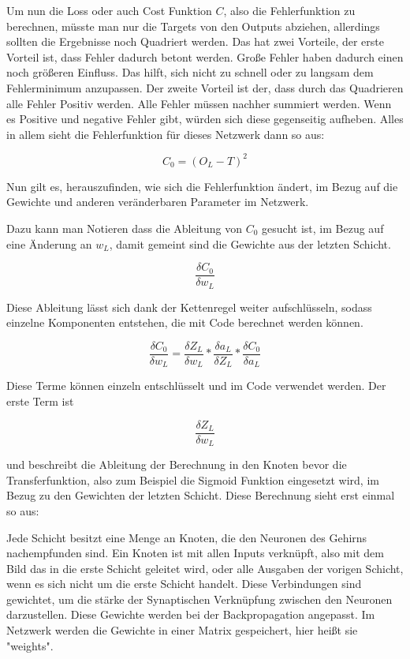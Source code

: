 \documentclass[12pt]{article}
\begin{document}
Um nun die Loss oder auch Cost Funktion $C$, also die Fehlerfunktion zu berechnen, müsste man nur die Targets von den Outputs abziehen, allerdings sollten die Ergebnisse noch Quadriert werden. Das hat zwei Vorteile, der erste Vorteil ist, dass Fehler dadurch betont werden. Große Fehler haben dadurch einen noch größeren Einfluss. Das hilft, sich nicht zu schnell oder zu langsam dem Fehlerminimum anzupassen. Der zweite Vorteil ist der, dass durch das Quadrieren alle Fehler Positiv werden. Alle Fehler müssen nachher summiert werden. Wenn es Positive und negative Fehler gibt, würden sich diese gegenseitig aufheben. 
Alles in allem sieht die Fehlerfunktion für dieses Netzwerk dann so aus:

$$C_0 = (O_L - T)^2$$

Nun gilt es, herauszufinden, wie sich die Fehlerfunktion ändert, im Bezug auf die Gewichte und anderen veränderbaren Parameter im Netzwerk.

Dazu kann man Notieren dass die Ableitung von $C_0$ gesucht ist, im Bezug auf eine Änderung an $w_L$, damit gemeint sind die Gewichte aus der letzten Schicht.

$$\frac{\delta C_0}{\delta w_L}$$

Diese Ableitung lässt sich dank der Kettenregel weiter aufschlüsseln, sodass einzelne Komponenten entstehen, die mit Code berechnet werden können.

$$\frac{\delta C_0}{\delta w_L}=
\frac{\delta Z_L}{\delta w_L}*
\frac{\delta a_L}{\delta Z_L}*
\frac{\delta C_0}{\delta a_L}$$

Diese Terme können einzeln entschlüsselt und im Code verwendet werden. Der erste Term ist

$$\frac{\delta Z_L}{\delta w_L}$$

und beschreibt die Ableitung der Berechnung in den Knoten bevor die Transferfunktion, also zum Beispiel die Sigmoid Funktion eingesetzt wird, im Bezug zu den Gewichten der letzten Schicht.
Diese Berechnung sieht erst einmal so aus:

Jede Schicht besitzt eine Menge an Knoten, die den Neuronen des Gehirns nachempfunden sind. Ein Knoten ist mit allen Inputs verknüpft, also mit dem Bild das in die erste Schicht geleitet wird, oder alle Ausgaben der vorigen Schicht, wenn es sich nicht um die erste Schicht handelt. Diese Verbindungen sind gewichtet, um die stärke der Synaptischen Verknüpfung zwischen den Neuronen darzustellen. Diese Gewichte werden bei der Backpropagation angepasst. Im Netzwerk werden die Gewichte in einer Matrix gespeichert, hier heißt sie "weights". 
\end{document}
